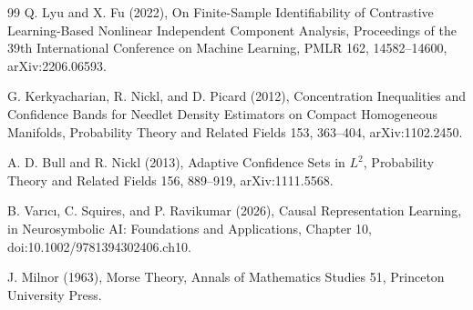 \documentclass{article}
\begin{document}
\begin{thebibliography}{99}
   Q. Lyu and X. Fu (2022), On Finite-Sample Identifiability of Contrastive Learning-Based Nonlinear Independent Component Analysis, Proceedings of the 39th International Conference on Machine Learning, PMLR 162, 14582--14600, arXiv:2206.06593.

   G. Kerkyacharian, R. Nickl, and D. Picard (2012), Concentration Inequalities and Confidence Bands for Needlet Density Estimators on Compact Homogeneous Manifolds, Probability Theory and Related Fields 153, 363--404, arXiv:1102.2450.

   A. D. Bull and R. Nickl (2013), Adaptive Confidence Sets in \(L^2\), Probability Theory and Related Fields 156, 889--919, arXiv:1111.5568.

   B. Varıcı, C. Squires, and P. Ravikumar (2026), Causal Representation Learning, in Neurosymbolic AI: Foundations and Applications, Chapter 10, doi:10.1002/9781394302406.ch10.

   J. Milnor (1963), Morse Theory, Annals of Mathematics Studies 51, Princeton University Press.

\end{thebibliography}
\end{document}
